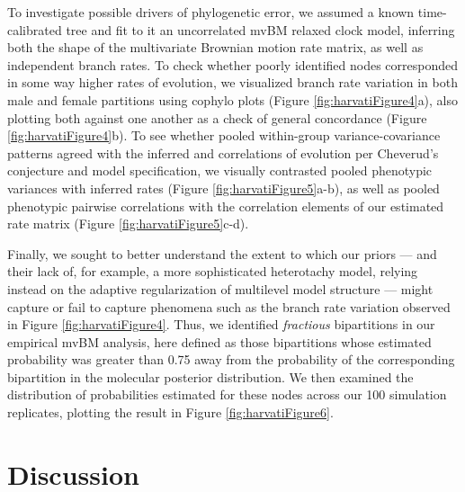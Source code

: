 \documentclass[10pt, twocolumn, twoside]{article}
\begin{document}
To investigate possible drivers of phylogenetic error, we assumed a known time-calibrated tree and fit to it an uncorrelated mvBM relaxed clock model, inferring both the shape of the multivariate Brownian motion rate matrix, as well as independent branch rates. To check whether poorly identified nodes corresponded in some way higher rates of evolution, we visualized branch rate variation in both male and female partitions using cophylo plots (Figure \ref{fig:harvatiFigure4}a), also plotting both against one another as a check of general concordance (Figure \ref{fig:harvatiFigure4}b). To see whether pooled within-group variance-covariance patterns agreed with the inferred and correlations of evolution per Cheverud's conjecture and model specification, we visually contrasted pooled phenotypic variances with inferred rates (Figure \ref{fig:harvatiFigure5}a-b), as well as pooled phenotypic pairwise correlations with the correlation elements of our estimated rate matrix (Figure \ref{fig:harvatiFigure5}c-d).

Finally, we sought to better understand the extent to which our priors --- and their lack of, for example, a more sophisticated heterotachy model, relying instead on the adaptive regularization of multilevel model structure --- might capture or fail to capture phenomena such as the branch rate variation observed in Figure \ref{fig:harvatiFigure4}. Thus, we identified \textit{fractious} bipartitions in our empirical mvBM analysis, here defined as those bipartitions whose estimated probability was greater than 0.75 away from the probability of the corresponding bipartition in the molecular posterior distribution. We then examined the distribution of probabilities estimated for these nodes across our 100 simulation replicates, plotting the result in Figure \ref{fig:harvatiFigure6}.

\section*{Discussion}
\end{document}
